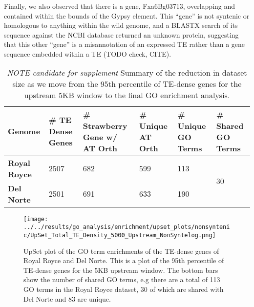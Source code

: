 \documentclass[fleqn,10pt]{olplainarticle}
\begin{document}
Finally, we also observed that there is a gene, Fxa6Bg03713, overlapping and contained within the bounds of the Gypsy element.
This ``gene'' is not syntenic or homologous to anything within the wild genome, and a BLASTX search of its sequence against the NCBI database returned an unknown protein, suggesting that this other ``gene'' is a misannotation of an expressed TE rather than a gene sequence embedded within a TE (TODO check, CITE).

\begin{table}[]
\centering
\small
\begin{tabular}{l|l|l|l|l|l}
\toprule
\textbf{Genome} & \textbf{\# TE Dense Genes} & \textbf{\# Strawberry Gene w/ AT Orth} & \textbf{\# Unique AT Orth} & \textbf{\# Unique GO Terms} & \textbf{\# Shared GO Terms} \\
\bottomrule
\textbf{Royal Royce}     & 2507                        & 682                                        & 599                      & 113                   & \multirow{2}{*}{30}          \\
\textbf{Del Norte}       & 2501                        & 691                                        & 633                      & 190                   &                              \\
\bottomrule
\end{tabular}
\caption{\textit{NOTE candidate for supplement} Summary of the reduction in dataset size as we move from the 95th percentile of TE-dense genes for the upstream 5KB window to the final GO enrichment analysis.}
\label{tab:upset_numbers}
\end{table}

\begin{figure}[ht]
\centering
\texttt{[image: ../../results/go\_analysis/enrichment/upset\_plots/nonsyntenic/UpSet\_Total\_TE\_Density\_5000\_Upstream\_NonSyntelog.png]}
	\caption{UpSet plot of the GO term enrichments of the TE-dense genes of Royal Royce and Del Norte. This is a plot of the 95th percentile of TE-dense genes for the 5KB upstream window. The bottom bars show the number of shared GO terms, e.g there are a total of 113 GO terms in the Royal Royce dataset, 30 of which are shared with Del Norte and 83 are unique.}
	\label{fig:go_compare_total_5K}
\end{figure}
\end{document}

